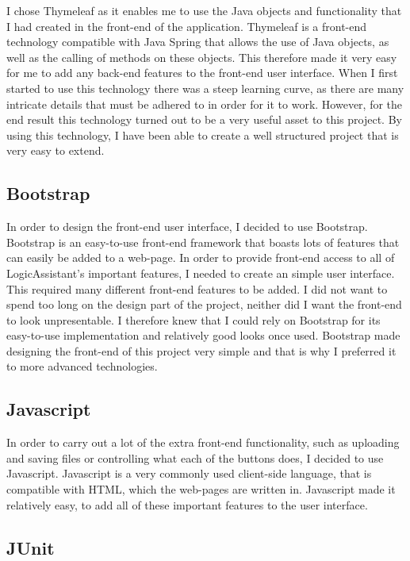 I chose Thymeleaf as it enables me to use the Java objects and functionality that I had created in the front-end of the application. Thymeleaf is a front-end technology compatible with Java Spring that allows the use of Java objects, as well as the calling of methods on these objects. This therefore made it very easy for me to add any back-end features to the front-end user interface. When I first started to use this technology there was a steep learning curve, as there are many intricate details that must be adhered to in order for it to work. However, for the end result this technology turned out to be a very useful asset to this project. By using this technology, I have been able to create a well structured project that is very easy to extend.

\subsection{Bootstrap \label{bootstrap}}
In order to design the front-end user interface, I decided to use Bootstrap. Bootstrap is an easy-to-use front-end framework that boasts lots of features that can easily be added to a web-page. In order to provide front-end access to all of LogicAssistant's important features, I needed to create an simple user interface. This required many different front-end features to be added. I did not want to spend too long on the design part of the project, neither did I want the front-end to look unpresentable. I therefore knew that I could rely on Bootstrap for its easy-to-use implementation and relatively good looks once used. Bootstrap made designing the front-end of this project very simple and that is why I preferred it to more advanced technologies.

\subsection{Javascript}

In order to carry out a lot of the extra front-end functionality, such as uploading and saving files or controlling what each of the buttons does, I decided to use Javascript. Javascript is a very commonly used client-side language, that is compatible with HTML, which the web-pages are written in. Javascript made it relatively easy, to add all of these important features to the user interface. 

\subsection{JUnit\label{JUnit}}

